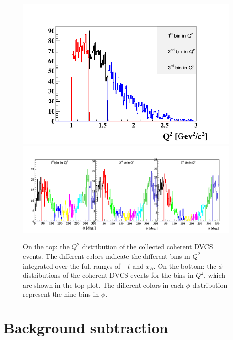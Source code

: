 \begin{figure}[h!]
\centering
\includegraphics[scale=0.36]{fig_results/Q2_Coh_bins.png}
\includegraphics[scale=0.45]{fig_results/bins_Coh_Q2_Phi.png}
\caption{On the top: the $Q^2$ distribution of the collected coherent DVCS 
   events. The different colors indicate the different bins in $Q^2$ integrated 
   over the full ranges of $-t$ and $x_B$. On the bottom: the $\phi$ 
   distributions of the coherent DVCS events for the bins in $Q^2$, which are 
shown in the top plot. The different colors in each $\phi$ distribution 
represent the nine bins in $\phi$.} \label{fig:coh_Q2_bins}
\end{figure}


\section{Background subtraction}
\label{Background_subtraction}

